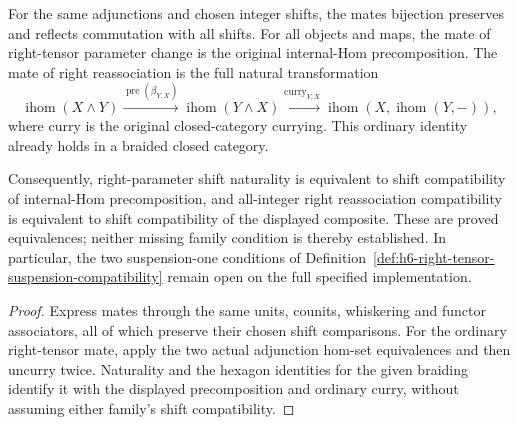 \begin{proposition}
  \label{prop:h6-tensor-mates-comparisons}
  \leanok
  For the same adjunctions and chosen integer shifts, the mates bijection
  preserves and reflects commutation with all shifts. For all objects and
  maps, the mate of right-tensor parameter change is the original internal-Hom
  precomposition. The mate of right reassociation is the full natural
  transformation
  \[
    \operatorname{ihom}(X\wedge Y)
      \xrightarrow{\operatorname{pre}(\beta_{Y,X})}
    \operatorname{ihom}(Y\wedge X)
      \xrightarrow{\operatorname{curry}_{Y,X}}
    \operatorname{ihom}(X,\operatorname{ihom}(Y,-)),
  \]
  where curry is the original closed-category currying. This ordinary identity already holds in a
  braided closed category.

  Consequently, right-parameter shift naturality is equivalent to shift
  compatibility of internal-Hom precomposition, and all-integer right
  reassociation compatibility is equivalent to shift compatibility of the
  displayed composite. These are proved equivalences; neither missing
  family condition is thereby established. In particular, the two
  suspension-one conditions of
  Definition~\ref{def:h6-right-tensor-suspension-compatibility} remain open
  on the full specified implementation.
\end{proposition}
\begin{proof}
  \leanok
  Express mates through the same units, counits, whiskering and functor
  associators, all of which preserve their chosen shift comparisons.
  For the ordinary right-tensor mate, apply the two actual adjunction
  hom-set equivalences and then uncurry twice. Naturality and the hexagon
  identities for the given braiding identify it with the displayed
  precomposition and ordinary curry, without assuming either family's
  shift compatibility.
\end{proof}

